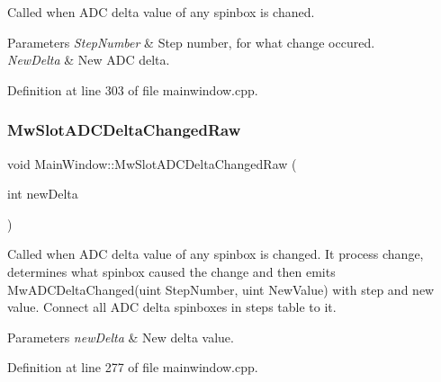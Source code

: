 Called when A\+DC delta value of any spinbox is chaned. 


\begin{DoxyParams}{Parameters}
{\em Step\+Number} & Step number, for what change occured. \\
\hline
{\em New\+Delta} & New A\+DC delta. \\
\hline
\end{DoxyParams}


Definition at line 303 of file mainwindow.\+cpp.

\mbox{\label{class_main_window_acbdfd3592779f6946c4fecc33c79e9a4}} 
\subsubsection{\texorpdfstring{Mw\+Slot\+A\+D\+C\+Delta\+Changed\+Raw}{MwSlotADCDeltaChangedRaw}}
{\footnotesize\ttfamily void Main\+Window\+::\+Mw\+Slot\+A\+D\+C\+Delta\+Changed\+Raw (\begin{DoxyParamCaption}\item[{int}]{new\+Delta }\end{DoxyParamCaption})\hspace{0.3cm}{\ttfamily [slot]}}



Called when A\+DC delta value of any spinbox is changed. It process change, determines what spinbox caused the change and then emits Mw\+A\+D\+C\+Delta\+Changed(uint Step\+Number, uint New\+Value) with step and new value. Connect all A\+DC delta spinboxes in steps table to it. 


\begin{DoxyParams}{Parameters}
{\em new\+Delta} & New delta value. \\
\hline
\end{DoxyParams}


Definition at line 277 of file mainwindow.\+cpp.

\mbox{\label{class_main_window_aaf5b44955c0c93824ea89edd3cdc5730}} 
